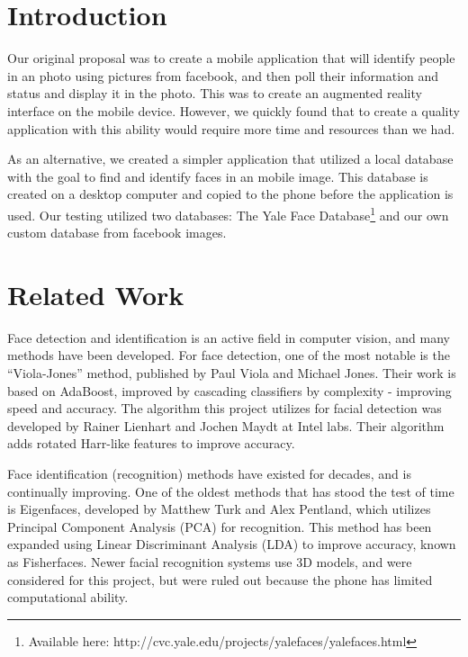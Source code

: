 \section{Introduction} %


Our original proposal was to create a mobile application that will
identify people in an photo using pictures from facebook, and then
poll their information and status and display it in the photo.  This
was to create an augmented reality interface on the mobile device.
However, we quickly found that to create a quality application with
this ability would require more time and resources than we had.

As an alternative, we created a simpler application that utilized a
local database with the goal to find and identify faces in an mobile
image.  This database is created on a desktop computer and copied to
the phone before the application is used.  Our testing utilized two
databases: The Yale Face Database\footnote{Available here:
  http://cvc.yale.edu/projects/yalefaces/yalefaces.html}\cite{YaleFace}
and our own custom database from facebook images.

\section{Related Work} %

Face detection and identification is an active field in computer
vision, and many methods have been developed.  For face detection, one
of the most notable is the ``Viola-Jones'' method, published by Paul
Viola and Michael Jones.\cite{ViolaJones} Their work is based on
AdaBoost\cite{AdaBoost}, improved by cascading classifiers by
complexity - improving speed and accuracy.  The algorithm this project
utilizes for facial detection was developed by Rainer Lienhart and
Jochen Maydt at Intel labs.\cite{Lienhart} Their algorithm adds
rotated Harr-like features to improve accuracy.

Face identification (recognition) methods have existed for decades,
and is continually improving.  One of the oldest methods that has
stood the test of time is Eigenfaces\cite{Eigenfaces}, developed by
Matthew Turk and Alex Pentland, which utilizes Principal Component
Analysis (PCA) for recognition.  This method has been expanded using
Linear Discriminant Analysis (LDA) to improve accuracy, known as
Fisherfaces. \cite{Fisherfaces} Newer facial recognition systems use
3D models\cite{3d}, and were considered for this project, but were
ruled out because the phone has limited computational ability.

